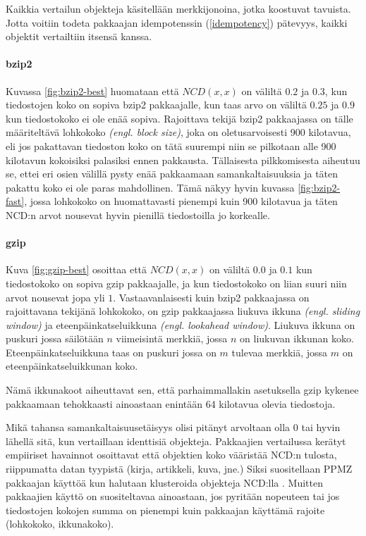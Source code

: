 \documentclass[12pt,finnish]{tktltiki2}
\theoremstyle{definition}
\theoremstyle{remark}
\newcommand{\engl}[1]{\emph{(engl. #1)}}
\begin{document}
      Kaikkia vertailun objekteja käsitellään merkkijonoina, jotka koostuvat tavuista.
      Jotta voitiin todeta pakkaajan idempotenssin (\ref{idempotency}) pätevyys, kaikki objektit vertailtiin itsensä kanssa.

      \paragraph{bzip2} %
      \label{par:bzip2}
        Kuvassa \ref{fig:bzip2-best} huomataan että $NCD(x,x)$ on väliltä $0.2$ ja $0.3$, kun tiedostojen koko on sopiva bzip2 pakkaajalle, kun taas arvo on väliltä $0.25$ ja $0.9$ kun tiedostokoko ei ole enää sopiva.
        Rajoittava tekijä bzip2 pakkaajassa on tälle määriteltävä lohkokoko \engl{block size}, joka on oletusarvoisesti 900 kilotavua, eli jos pakattavan tiedoston koko on tätä suurempi niin se pilkotaan alle 900 kilotavun kokoisiksi palasiksi ennen pakkausta.
        Tällaisesta pilkkomisesta aiheutuu se, ettei eri osien välillä pysty enää pakkaamaan samankaltaisuuksia ja täten pakattu koko ei ole paras mahdollinen.
        Tämä näkyy hyvin kuvassa \ref{fig:bzip2-fast}, jossa lohkokoko on huomattavasti pienempi kuin 900 kilotavua ja täten NCD:n arvot nousevat hyvin pienillä tiedostoilla jo korkealle.

      \paragraph{gzip} %
      \label{par:gzip}
        Kuva \ref{fig:gzip-best} osoittaa että $NCD(x,x)$ on väliltä $0.0$ ja $0.1$ kun tiedostokoko on sopiva gzip pakkaajalle, ja kun tiedostokoko on liian suuri niin arvot nousevat jopa yli $1$.
        Vastaavanlaisesti kuin bzip2 pakkaajassa on rajoittavana tekijänä lohkokoko, on gzip pakkaajassa liukuva ikkuna \engl{sliding window} ja eteenpäinkatseluikkuna \engl{lookahead window}.
        Liukuva ikkuna on puskuri jossa säilötään $n$ viimeisintä merkkiä, jossa $n$ on liukuvan ikkunan koko.
        Eteenpäinkatseluikkuna taas on puskuri jossa on $m$ tulevaa merkkiä, jossa $m$ on eteenpäinkatseluikkunan koko.

        Nämä ikkunakoot aiheuttavat sen, että parhaimmallakin asetuksella gzip kykenee pakkaamaan tehokkaasti ainoastaan enintään 64 kilotavua olevia tiedostoja.

      Mikä tahansa samankaltaisuusetäisyys olisi pitänyt arvoltaan olla $0$ tai hyvin lähellä sitä, kun vertaillaan identtisiä objekteja.
      Pakkaajien vertailussa kerätyt empiiriset havainnot osoittavat että objektien koko vääristää NCD:n tulosta, riippumatta datan tyypistä (kirja, artikkeli, kuva, jne.)
      Siksi suositellaan PPMZ pakkaajan käyttöä kun halutaan klusteroida objekteja NCD:lla \cite{cebrian2005common}.
      Muitten pakkaajien käyttö on suositeltavaa ainoastaan, jos pyritään nopeuteen tai jos tiedostojen kokojen summa on pienempi kuin pakkaajan käyttämä rajoite (lohkokoko, ikkunakoko).
\end{document}
